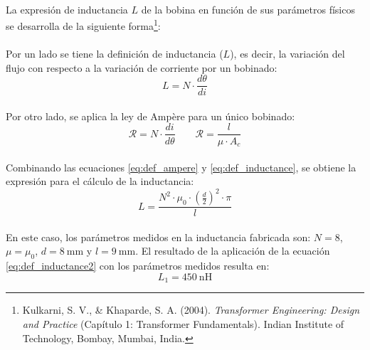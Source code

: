 \paragraph{}
La expresión de inductancia $L$ de la bobina en función de sus parámetros físicos se desarrolla de la siguiente forma\footnote{Kulkarni, S. V., \& Khaparde, S. A. (2004). \textit{Transformer Engineering: Design and Practice} (Capítulo 1: Transformer Fundamentals). Indian Institute of Technology, Bombay, Mumbai, India.}:
\paragraph{}
Por un lado se tiene la definici\'on de inductancia ($L$), es decir, la variación del flujo con respecto a la variación de corriente por un bobinado: 
\begin{equation}
   \label{eq:def_inductance}
   L = N \cdot \frac{d\theta}{di}
\end{equation}
\paragraph{}
Por otro lado, se aplica la ley de Amp\`ere para un único bobinado:
\begin{equation}
   \label{eq:def_ampere}
   \mathcal{R} = N \cdot \frac{di}{d\theta} \quad \quad
   \mathcal{R} = \frac{l}{\mu \cdot A_c}
\end{equation}
\paragraph{}
Combinando las ecuaciones \ref{eq:def_ampere} y \ref{eq:def_inductance}, se obtiene la expresi\'on para el c\'alculo de la inductancia:
\begin{equation}
   \label{eq:def_inductance2}
   L = \frac{N^2 \cdot \mu_0 \cdot \left(\frac{d}{2} \right)^2 \cdot \pi}{l}
\end{equation}
\paragraph{}
En este caso, los par\'ametros medidos en la inductancia fabricada son: $N = 8$, $\mu = \mu_0$, $d = \SI{8}{\milli\metre}$ y $l = \SI{9}{\milli\metre}$. El resultado de la aplicaci\'on de la ecuaci\'on \ref{eq:def_inductance2} con los par\'ametros medidos resulta en: $$L_1 = \SI{450}{\nano\henry}$$

